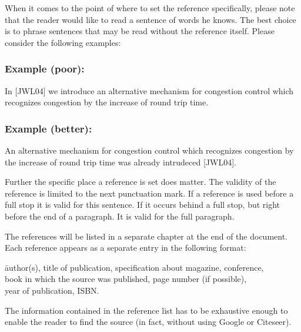 When it comes to the point of where to set the reference specifically, please note that the reader would like to read a sentence of words he knows.
The best choice is to phrase sentences that may be read without the reference itself. Please consider the following examples:

    \begin{example}
      \subsubsection*{Example (poor):}
      In [JWL04] we introduce an alternative mechanism for congestion
      control which recognizes congestion by the increase of round
      trip time.

      \subsubsection*{Example (better):}
      An alternative mechanism for congestion
      control which recognizes congestion by the increase of round
      trip time was already intrudeced [JWL04].
    \end{example}

Further the specific place a reference is set does matter. The validity of the reference is limited to the next punctuation mark. If a reference is used before a full stop it is valid for this sentence. If it occurs behind a full stop, but right before the end of a paragraph. It is valid for the full paragraph.

The references will be listed in a separate chapter at the end of the document. Each reference appears as a separate entry in the following format:

\begin{example}
  \begin{tabbing}
    [Signature] \= author(s), title of publication, specification about magazine,
    conference, \\ \> book in which the source was published, page number (if possible),\\
    \> year of publication, ISBN.
  \end{tabbing}
\end{example}

The information contained in the reference list has to be exhaustive enough to enable the reader to find the source (in fact, without using Google or Citeseer).



